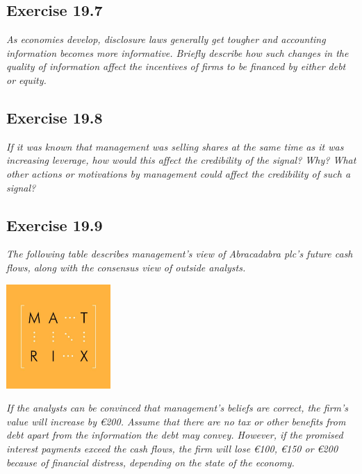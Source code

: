 \documentclass[]{book}
\newcommand{\euro}{€}
\theoremstyle{definition}
\theoremstyle{definition}
\theoremstyle{remark}
\begin{document}
\subsection{Exercise 19.7}\label{exercise-19.7}

\emph{As economies develop, disclosure laws generally get tougher and
accounting information becomes more informative. Briefly describe how
such changes in the quality of information affect the incentives of
firms to be financed by either debt or equity.} \citep[p.641]{book}

\subsection{Exercise 19.8}\label{exercise-19.8}

\emph{If it was known that management was selling shares at the same
time as it was increasing leverage, how would this affect the
credibility of the signal? Why? What other actions or motivations by
management could affect the credibility of such a signal?}
\citep[p.641]{book}

\subsection{Exercise 19.9}\label{exercise-19.9}

\emph{The following table describes management's view of Abracadabra
plc's future cash flows, along with the consensus view of outside
analysts.} \citep[p.641]{book}

\begin{center}\includegraphics[width=150px]{figures/matrix} \end{center}

\emph{If the analysts can be convinced that management's beliefs are
correct, the firm's value will increase by \euro{}200. Assume that there
are no tax or other benefits from debt apart from the information the
debt may convey. However, if the promised interest payments exceed the
cash flows, the firm will lose \euro{}100, \euro{}150 or \euro{}200
because of financial distress, depending on the state of the economy.}
\citep[p.641]{book}
\end{document}
